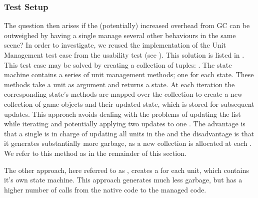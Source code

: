 \subsubsection{Test Setup}
The question then arises if the (potentially) increased overhead from \gls{GC} can be outweighed by having a single  manage several other behaviours in the same scene? In order to investigate, we reused the implementation of the Unit Management test case from the usability test (see ). This solution is listed in . This test case may be solved by creating a collection of tuples: . The state machine contains a series of unit management methods; one for each state. These methods take a unit as argument and returns a state. At each iteration the corresponding state's methods are mapped over the collection to create a new collection of game objects and their updated state, which is stored for subsequent updates. This approach avoids dealing with the problems of updating the list while iterating and potentially applying two updates to one . The advantage is that a single  is in charge of updating all units in the  and the disadvantage is that it generates substantially more garbage, as a new collection is allocated at each . We refer to this method as  in the remainder of this section.

The other approach, here referred to as , creates a  for each unit, which contains it's own state machine. This approach generates much less garbage, but has a higher number of calls from the native code to the managed code.

